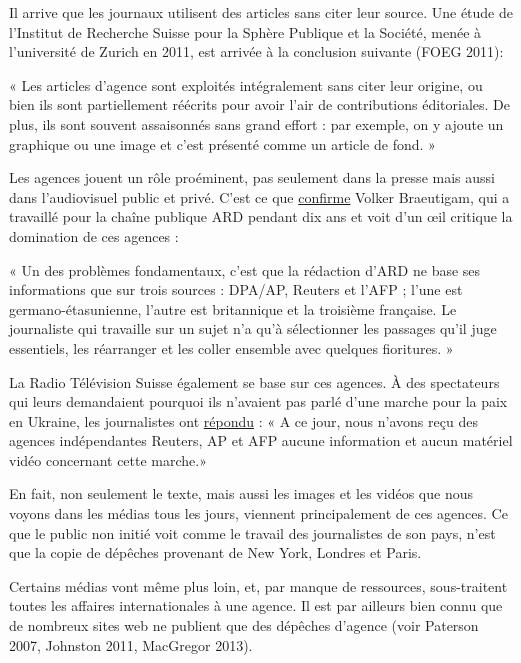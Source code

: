 Il arrive que les journaux utilisent des articles sans citer leur
source. Une étude de l'Institut de Recherche Suisse pour la Sphère
Publique et la Société, menée à l'université de Zurich en 2011, est
arrivée à la conclusion suivante (FOEG 2011):

« Les articles d'agence sont exploités intégralement sans citer leur
origine, ou bien ils sont partiellement réécrits pour avoir l'air de
contributions éditoriales. De plus, ils sont souvent assaisonnés sans
grand effort : par exemple, on y ajoute un graphique ou une image et
c'est présenté comme un article de fond. »

Les agences jouent un rôle proéminent, pas seulement dans la presse mais
aussi dans l'audiovisuel public et privé. C'est ce que
\href{http://www.heise.de/tp/artikel/47/47821/3.html}{confirme} Volker
Braeutigam, qui a travaillé pour la chaîne publique ARD pendant dix ans
et voit d'un œil critique la domination de ces agences :

« Un des problèmes fondamentaux, c'est que la rédaction d'ARD ne base
ses informations que sur trois sources : DPA/AP, Reuters et l'AFP ;
l'une est germano-étasunienne, l'autre est britannique et la troisième
française. Le journaliste qui travaille sur un sujet n'a qu'à
sélectionner les passages qu'il juge essentiels, les réarranger et les
coller ensemble avec quelques fioritures. »

La Radio Télévision Suisse également se base sur ces agences. À des
spectateurs qui leurs demandaient pourquoi ils n'avaient pas parlé d'une
marche pour la paix en Ukraine, les journalistes ont
\href{http://www.srf.ch/sendungen/hallosrf/warum-berichtet-srf-nicht-ueber-den-friedensmarsch-in-der-ukraine}{répondu}
: « A ce jour, nous n'avons reçu des agences indépendantes Reuters, AP
et AFP aucune information et aucun matériel vidéo concernant cette
marche.»

En fait, non seulement le texte, mais aussi les images et les vidéos que
nous voyons dans les médias tous les jours, viennent principalement de
ces agences. Ce que le public non initié voit comme le travail des
journalistes de son pays, n'est que la copie de dépêches provenant de
New York, Londres et Paris.

Certains médias vont même plus loin, et, par manque de ressources,
sous-traitent toutes les affaires internationales à une agence. Il est
par ailleurs bien connu que de nombreux sites web ne publient que des
dépêches d'agence (voir Paterson 2007, Johnston 2011, MacGregor 2013).

